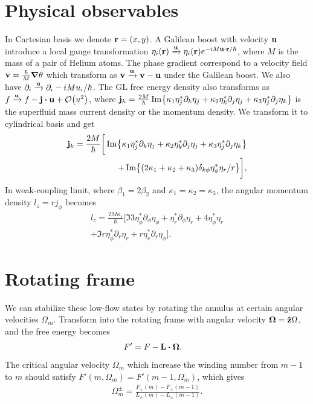 \documentclass[aps,prl,preprint]{revtex4-2}
\begin{document}
\section{Physical observables}
In Cartesian basis we denote $\vb{r} = (x, y)$.
A Galilean boost with velocity $\vb{u}$ introduce a local gauge transformation
$\eta_i(\vb{r}) \xrightarrow{\vb{u}} \eta_i(\vb{r}) e^{-iM\vb{u}\vdot\vb{r}/\hbar}$,
where $M$ is the mass of a pair of Helium atoms. The phase gradient correspond to a velocity field
$\vb{v} = \frac{\hbar}{M}\grad{\theta}$ which transform as
$\vb{v} \xrightarrow{\vb{u}} \vb{v} - \vb{u}$ under the Galilean boost. We also have
$\partial_i \xrightarrow{\vb{u}} \partial_i - iMu_i/\hbar$.
The GL free energy density also transforms as
$f\xrightarrow{\vb{u}}f - \vb{j}\vdot\vb{u} + \order{u^2}$, where
$\vb{j}_k = \frac{2M}{\hbar}\Im{\kappa_1\eta_j^*\partial_k\eta_j + \kappa_2\eta_k^*\partial_j\eta_j + \kappa_3\eta_j^*\partial_j\eta_k}$
is the superfluid mass current density or the momentum density.
We transform it to cylindrical basis and get
\begin{align}\label{j}
    \vb{j}_k=\frac{2M}{\hbar}\bigg[\Im{\kappa_1\eta_j^*\partial_k\eta_j+\kappa_2\eta_k^*\partial_j\eta_j+\kappa_3\eta_j^*\partial_j\eta_k}\nonumber \\
        +\Im{(2\kappa_1+\kappa_2+\kappa_3)\delta_{k\phi}\eta_\phi^*\eta_r/r}\bigg],
\end{align}
In weak-coupling limit,
where $\beta_1=2\beta_2$ and $\kappa_1=\kappa_2=\kappa_3$, the angular momentum
density $l_z=rj_\phi$ becomes
\begin{align}\label{l_density}
    l_z=\frac{2M\kappa_1}{\hbar}\bigg[\Im{3\eta_\phi^*\partial_\phi\eta_\phi+\eta_r^*\partial_\phi\eta_r+4\eta_\phi^*\eta_r}\nonumber \\
        +\Im{r\eta_\phi^*\partial_r\eta_r+r\eta_r^*\partial_r\eta_\phi}\bigg].
\end{align}

\section{Rotating frame}

We can stabilize these low-flow states by rotating the annulus at
certain angular velocities $\Omega_m$. Transform into the rotating frame
with angular velocity $\vb{\Omega}=\vu{z}\Omega$, and the free energy becomes
\begin{align}
    F' & =F-\vb{L}\vdot\vb{\Omega}.
\end{align}
The critical angular velocity $\Omega_m$ which increase the winding number from $m-1$ to $m$ should
satisfy $F'(m,\Omega_m)=F'(m-1,\Omega_m)$, which gives
\begin{align}
    \Omega_m^\pm=\frac{F_\pm(m) - F_\pm(m-1)}{L_\pm(m) - L_\pm(m-1)}. \label{omega_m}
\end{align}
\end{document}
